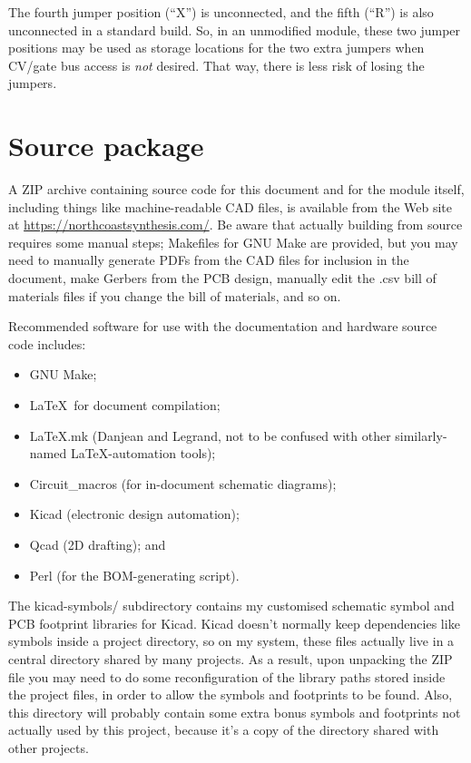 The fourth jumper position (``X'') is unconnected, and the fifth (``R'')
is also unconnected in a standard build.  So, in an unmodified module, these
two jumper positions may be used as storage locations for the two extra
jumpers when CV/gate bus access is \emph{not} desired.  That way, there is
less risk of losing the jumpers.

\section{Source package}

A ZIP archive containing source code for this document and for the module
itself, including things like machine-readable CAD files, is available from 
the Web site at 
\url{https://northcoastsynthesis.com/}.  Be aware that actually building
from source requires some manual steps; Makefiles for GNU Make are provided,
but you may need to manually generate PDFs from the CAD files for inclusion
in the document, make Gerbers from the PCB design, manually edit the .csv
bill of materials files if you change the bill of materials, and so on.

Recommended software for use with the documentation and hardware source code
includes:
\begin{itemize}
  \item GNU Make;
  \item \LaTeX\ for document compilation;
  \item LaTeX.mk (Danjean and Legrand, not to be confused with other
    similarly-named \LaTeX-automation tools);
  \item Circuit\_macros (for in-document schematic diagrams);
  \item Kicad (electronic design automation);
  \item Qcad (2D drafting); and
  \item Perl (for the BOM-generating script).
\end{itemize}

The kicad-symbols/ subdirectory contains my customised schematic symbol and
PCB footprint libraries for Kicad.  Kicad doesn't normally keep dependencies
like symbols inside a project directory, so on my system, these files
actually live in a central directory shared by many projects.  As a result,
upon unpacking the ZIP file you may need to do some reconfiguration of the
library paths stored inside the project files, in order to allow the symbols
and footprints to be found.  Also, this directory will probably contain some
extra bonus symbols and footprints not actually used by this project,
because it's a copy of the directory shared with other projects.

